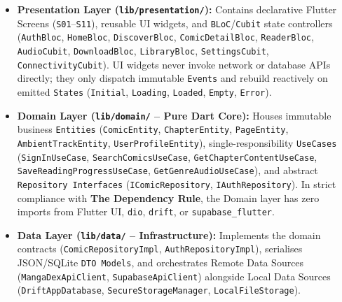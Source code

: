 \begin{itemize}
    \item \textbf{Presentation Layer (\texttt{lib/presentation/}):} Contains declarative Flutter Screens (\texttt{S01}--\texttt{S11}), reusable UI widgets, and \texttt{BLoC}/\texttt{Cubit} state controllers (\texttt{AuthBloc}, \texttt{HomeBloc}, \texttt{DiscoverBloc}, \texttt{Comic\allowbreak Detail\allowbreak Bloc}, \texttt{ReaderBloc}, \texttt{AudioCubit}, \texttt{DownloadBloc}, \texttt{LibraryBloc}, \texttt{SettingsCubit}, \texttt{Connectivity\allowbreak Cubit}). UI widgets never invoke network or database APIs directly; they only dispatch immutable \texttt{Events} and rebuild reactively on emitted \texttt{States} (\texttt{Initial}, \texttt{Loading}, \texttt{Loaded}, \texttt{Empty}, \texttt{Error}).
    \item \textbf{Domain Layer (\texttt{lib/domain/} -- Pure Dart Core):} Houses immutable business \texttt{Entities} (\texttt{ComicEntity}, \texttt{ChapterEntity}, \texttt{PageEntity}, \texttt{AmbientTrackEntity}, \texttt{UserProfile\allowbreak Entity}), single-responsibility \texttt{UseCases} (\texttt{SignInUseCase}, \texttt{Search\allowbreak Comics\allowbreak UseCase}, \texttt{Get\allowbreak Chapter\allowbreak Content\allowbreak UseCase}, \texttt{Save\allowbreak Reading\allowbreak Progress\allowbreak UseCase}, \texttt{Get\allowbreak Genre\allowbreak Audio\allowbreak UseCase}), and abstract \texttt{Repository Interfaces} (\texttt{IComicRepository}, \texttt{IAuthRepository}). In strict compliance with \textbf{The Dependency Rule}, the Domain layer has zero imports from Flutter UI, \texttt{dio}, \texttt{drift}, or \texttt{supabase\_flutter}.
    \item \textbf{Data Layer (\texttt{lib/data/} -- Infrastructure):} Implements the domain contracts (\texttt{Comic\allowbreak Repository\allowbreak Impl}, \texttt{Auth\allowbreak Repository\allowbreak Impl}), serialises JSON/SQLite \texttt{DTO Models}, and orchestrates Remote Data Sources (\texttt{Manga\allowbreak Dex\allowbreak Api\allowbreak Client}, \texttt{Supabase\allowbreak Api\allowbreak Client}) alongside Local Data Sources (\texttt{Drift\allowbreak App\allowbreak Database}, \texttt{Secure\allowbreak Storage\allowbreak Manager}, \texttt{Local\allowbreak File\allowbreak Storage}).
\end{itemize}

